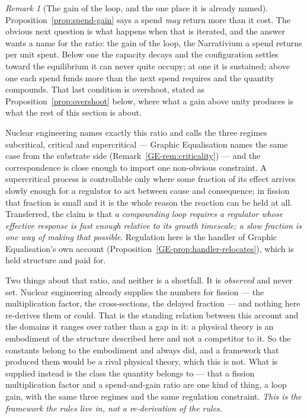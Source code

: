 \documentclass[11pt,a4paper]{article}
\theoremstyle{remark}
\newtheorem{remark}[definition]{Remark}
\begin{document}
\begin{remark}[The gain of the loop, and the one place it is already named]\label{rem:supercritical}
Proposition~\ref{prop:spend-gain} says a spend \emph{may} return more than it cost. The obvious next
question is what happens when that is iterated, and the answer wants a name for the ratio: the gain of
the loop, the Narrativium a spend returns per unit spent. Below one the capacity decays and the
configuration settles toward the equilibrium it can never quite occupy; at one it is sustained; above
one each spend funds more than the next spend requires and the quantity compounds. That last condition
is overshoot, stated as Proposition~\ref{prop:overshoot} below, where what a gain above unity produces
is what the rest of this section is about.

Nuclear engineering names exactly this ratio and calls the three regimes subcritical, critical and
supercritical --- Graphic Equalisation names the same case from the substrate side
(Remark~\ref{GE-rem:criticality}) --- and the correspondence is close enough to import one
non-obvious constraint. A
supercritical process is controllable only where some fraction of its effect arrives slowly enough for
a regulator to act between cause and consequence; in fission that fraction is small and it is the whole
reason the reaction can be held at all. Transferred, the claim is that \emph{a compounding loop requires a regulator whose effective response is fast enough relative to its growth timescale; a slow fraction is one way of making that possible}. Regulation here is the handler of
Graphic Equalisation's own account (Proposition~\ref{GE-prop:handler-relocates}), which is held
structure and paid for.

Two things about that ratio, and neither is a shortfall. It is \emph{observed} and never set. Nuclear
engineering already supplies the numbers for fission --- the multiplication factor, the cross-sections,
the delayed fraction --- and nothing here re-derives them or could. That is the standing relation
between this account and the domains it ranges over rather than a gap in it: a physical theory is an
embodiment of the structure described here and not a competitor to it. So the constants belong to the
embodiment and always did, and a framework that produced them would be a rival physical theory, which
this is not. What is supplied instead is the class the quantity belongs to --- that a fission
multiplication factor and a spend-and-gain ratio are one kind of thing, a loop gain, with the same
three regimes and the same regulation constraint. \emph{This is the framework the rules live in, not a
re-derivation of the rules.}


\end{remark}
\end{document}
